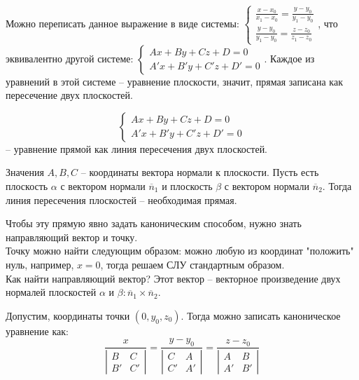 	Можно переписать данное выражение в виде системы: 
	$ \begin{cases}
		\frac{x - x_0}{x_1 - x_0} = \frac{y - y_0}{y_1 - y_0} \\
		\frac{y - y_0}{y_1 - y_0} = \frac{z - z_0}{z_1 - z_0}
	\end{cases} $, что эквивалентно другой системе:
	$ \begin{cases}
		Ax + By + Cz + D = 0 \\
		A'x + B'y + C'z + D' = 0
	\end{cases} $. Каждое из уравнений в этой системе -- уравнение плоскости, значит, прямая записана как пересечение двух плоскостей.

	\begin{Def}
		$$ \begin{cases}
			Ax + By + Cz + D = 0 \\
			A'x + B'y + C'z + D' = 0
		\end{cases} $$ -- уравнение прямой как линия пересечения двух плоскостей.
	\end{Def}

	Значения $A, B, C$ -- координаты вектора нормали к плоскости. 
	Пусть есть плоскость $\alpha$ с вектором нормали $\overline{n}_1$ и плоскость $\beta$ с вектором нормали $\overline{n}_2$. Тогда линия пересечения плоскостей -- необходимая прямая. 
	
	\begin{figure}[h]
		\centering
		\def\svgwidth{0.25\columnwidth}
		
	\end{figure}

	Чтобы эту прямую явно задать каноническим способом, нужно знать направляющий вектор и точку. \\
	Точку можно найти следующим образом: можно любую из координат "положить" нуль, например, $x = 0$, тогда решаем СЛУ стандартным образом.\\
	Как найти направляющий вектор? Этот вектор -- векторное произведение двух нормалей плоскостей $\alpha$ и $\beta: \overline{n}_1 \times \overline{n}_2$.
	
	\begin{Example}
		Допустим, координаты точки $(0, y_0, z_0)$. Тогда можно записать каноническое уравнение как:
		$$\frac{x}{
			\left|\begin{array}{cccc}
				B & C \\ 
				B' & C'
				\end{array}\right| 
		} = \frac{y - y_0}{
			\left|\begin{array}{cccc}
				C & A \\ 
				C' & A'
				\end{array}\right| 
		} = \frac{z - z_0}{
			\left|\begin{array}{cccc}
				A & B \\ 
				A' & B'
				\end{array}\right| 
		}
		$$
	\end{Example}

